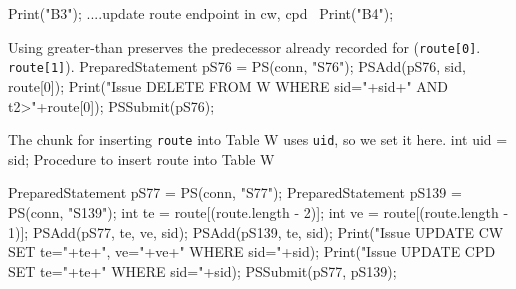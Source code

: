 \documentclass{article}
\def\nwendcode{\endtrivlist \endgroup}      %
\let\nwdocspar=\par
\theoremstyle{definition}                   %
\begin{document}
Print("B3");
\LA{}....update route endpoint in cw, cpd~{\nwtagstyle{}}\RA{}
Print("B4");
\nwendcode{}\nwdocspar
Using greater-than preserves the predecessor already recorded for ({\tt{}route[0]}. {\tt{}route[1]}).
\nwenddocs{}\endmoddef{}
PreparedStatement pS76 = PS(conn, "S76");
PSAdd(pS76, sid, route[0]);
Print("Issue DELETE FROM W WHERE sid="+sid+" AND t2>"+route[0]);
PSSubmit(pS76);
\nwendcode{}\nwdocspar
The chunk for inserting {\tt{}route} into Table W uses {\tt{}uid}, so we set it here.
\nwenddocs{}\endmoddef{}
int uid = sid;
\LA{}Procedure to insert \code{}route\edoc{} into Table W~{\nwtagstyle{}}\RA{}
\nwendcode{}\nwdocspar
\nwenddocs{}\endmoddef{}
PreparedStatement pS77 = PS(conn, "S77");
PreparedStatement pS139 = PS(conn, "S139");
int te = route[(route.length - 2)];
int ve = route[(route.length - 1)];
PSAdd(pS77, te, ve, sid);
PSAdd(pS139, te, sid);
Print("Issue UPDATE CW SET te="+te+", ve="+ve+" WHERE sid="+sid);
Print("Issue UPDATE CPD SET te="+te+" WHERE sid="+sid);
PSSubmit(pS77, pS139);
\nwendcode{}\nwdocspar
\end{document}
